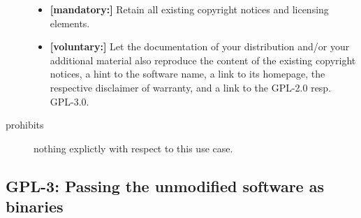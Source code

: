 \begin{description}
\begin{itemize}
  \item \textbf{[mandatory:]} Retain all existing copyright notices and
  licensing elements.
    
  \item \textbf{[voluntary:]} Let the documentation of your distribution and/or
  your additional material also reproduce the content of the existing
  copyright notices, a hint to the software name, a link to its homepage,
  the respective disclaimer of warranty, and a link to the GPL-2.0 resp.
  GPL-3.0.

\end{itemize}

\item[prohibits] nothing explictly with respect to this use case.

\end{description}


\subsection{GPL-3: Passing the unmodified software as binaries} 
\label{OSUC-02B-GPL} \label{OSUC-05B-GPL} \label{OSUC-07B-GPL} 

